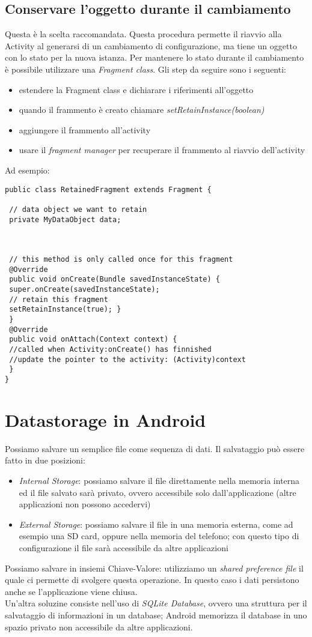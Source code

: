 \subsection{Conservare l'oggetto durante il cambiamento}
Questa è la scelta raccomandata. Questa procedura permette il riavvio alla 
Activity al generarsi di un cambiamento di configurazione, ma tiene un oggetto
con lo stato per la nuova istanza. Per mantenere lo stato durante il 
cambiamento è possibile utilizzare una \textit{Fragment class}.
Gli step da seguire sono i seguenti:
\begin{itemize}
    \item estendere la Fragment class e dichiarare i riferimenti all'oggetto
    \item quando il frammento è creato chiamare
\textit{setRetainInstance(boolean)}
    \item aggiungere il frammento all'activity
    \item usare il \textit{fragment manager} per recuperare il frammento al
riavvio dell'activity
\end{itemize}
Ad esempio:
\begin{lstlisting}[frame=single]
public class RetainedFragment extends Fragment {

 // data object we want to retain
 private MyDataObject data;



 // this method is only called once for this fragment
 @Override
 public void onCreate(Bundle savedInstanceState) {
 super.onCreate(savedInstanceState);
 // retain this fragment
 setRetainInstance(true); }
 }
 @Override
 public void onAttach(Context context) {
 //called when Activity:onCreate() has finnished
 //update the pointer to the activity: (Activity)context
 }
}
\end{lstlisting}
\section{Datastorage in Android}
Possiamo salvare un semplice file come sequenza di dati. Il salvataggio può 
essere fatto in due posizioni:
\begin{itemize}
    \item \textit{Internal Storage}: possiamo salvare il file direttamente nella
memoria interna ed il file salvato sarà privato, ovvero accessibile solo
dall'applicazione (altre applicazioni non possono accedervi)
    \item \textit{External Storage}: possiamo salvare il file in una memoria
esterna, come ad esempio una SD card, oppure nella memoria del telefono; con
questo tipo di configurazione il file sarà accessibile da altre applicazioni
\end{itemize}
Possiamo salvare in insiemi Chiave-Valore: utilizziamo un \textit{shared
preference file} il quale ci permette di svolgere questa operazione. In questo
caso i dati persistono anche se l'applicazione viene chiusa. \\
Un'altra soluzine consiste nell'uso di \textit{SQLite Database}, ovvero una
struttura per il salvataggio di informazioni in un database; Android memorizza
il database in uno spazio privato non accessibile da altre applicazioni.
